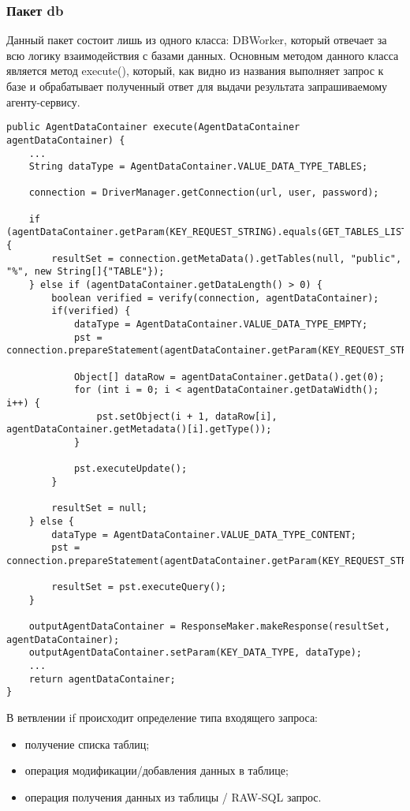 \subsubsection{Пакет db}
Данный пакет состоит лишь из одного класса: DBWorker, который отвечает за всю логику взаимодействия с базами данных. Основным методом данного класса является метод execute(), который, как видно из названия выполняет запрос к базе и обрабатывает полученный ответ для выдачи результата запрашиваемому агенту-сервису.
\begin{lstlisting}
public AgentDataContainer execute(AgentDataContainer agentDataContainer) {
    ...
    String dataType = AgentDataContainer.VALUE_DATA_TYPE_TABLES;

    connection = DriverManager.getConnection(url, user, password);

    if (agentDataContainer.getParam(KEY_REQUEST_STRING).equals(GET_TABLES_LIST)) {
        resultSet = connection.getMetaData().getTables(null, "public", "%", new String[]{"TABLE"});
    } else if (agentDataContainer.getDataLength() > 0) {
        boolean verified = verify(connection, agentDataContainer);
        if(verified) {
            dataType = AgentDataContainer.VALUE_DATA_TYPE_EMPTY;
            pst = connection.prepareStatement(agentDataContainer.getParam(KEY_REQUEST_STRING));

            Object[] dataRow = agentDataContainer.getData().get(0);
            for (int i = 0; i < agentDataContainer.getDataWidth(); i++) {
                pst.setObject(i + 1, dataRow[i], agentDataContainer.getMetadata()[i].getType());
            }

            pst.executeUpdate();
        }

        resultSet = null;
    } else {
        dataType = AgentDataContainer.VALUE_DATA_TYPE_CONTENT;
        pst = connection.prepareStatement(agentDataContainer.getParam(KEY_REQUEST_STRING));

        resultSet = pst.executeQuery();
    }

    outputAgentDataContainer = ResponseMaker.makeResponse(resultSet, agentDataContainer);
    outputAgentDataContainer.setParam(KEY_DATA_TYPE, dataType);
    ...
    return agentDataContainer;
}
\end{lstlisting}

В ветвлении if происходит определение типа входящего запроса:
\begin{itemize}
\item получение списка таблиц;
\item операция модификации/добавления данных в таблице;
\item операция получения данных из таблицы / RAW-SQL запрос.
\end{itemize}

